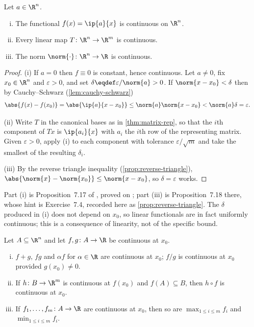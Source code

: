 \begin{proposition}
	\label{prop:linear-continuous}
	Let $a\in\R^n$.
	\begin{enumerate}[(i)]
		\item The functional $f(x)=\ip{a}{x}$ is continuous on $\R^n$.
		\item Every linear map $T\colon\R^n\to\R^m$ is continuous.
		\item The norm $\norm{\cdot}\colon\R^n\to\R$ is continuous.
	\end{enumerate}
\end{proposition}

\begin{proof}
	(i) If $a=0$ then $f\equiv0$ is constant, hence continuous. Let $a\neq0$, fix
	$x_0\in\R^n$ and $\varepsilon>0$, and set $\delta\eqdef\varepsilon/\norm{a}>0$.
	If $\norm{x-x_0}<\delta$ then by Cauchy--Schwarz
	(\autoref{lem:cauchy-schwarz})
	\[
		\abs{f(x)-f(x_0)}=\abs{\ip{a}{x-x_0}}\leq\norm{a}\norm{x-x_0}
		<\norm{a}\delta=\varepsilon .
	\]

	(ii) Write $T$ in the canonical bases as in \autoref{thm:matrix-rep}, so that the
	$i$th component of $Tx$ is $\ip{a_i}{x}$ with $a_i$ the $i$th row of the
	representing matrix. Given $\varepsilon>0$, apply (i) to each component with
	tolerance $\varepsilon/\sqrt m$ and take the smallest of the resulting $\delta_i$.

	(iii) By the reverse triangle inequality (\autoref{prop:reverse-triangle}),
	$\abs{\norm{x}-\norm{x_0}}\leq\norm{x-x_0}$, so $\delta=\varepsilon$ works.
\end{proof}

Part (i) is Proposition~7.17 of \textcite{fukuda2026notes}, proved on
\autocite[slide 52]{fukuda2026analysis}; part (iii) is Proposition~7.18 there,
whose hint is Exercise~7.4, recorded here as
\autoref{prop:reverse-triangle}. The $\delta$ produced in (i) does not depend on
$x_0$, so linear functionals are in fact uniformly continuous; this is a
consequence of linearity, not of the specific bound.

\begin{proposition}\label{prop:continuity-algebra}
	Let $A\subseteq\R^n$ and let $f,g\colon A\to\R$ be continuous at $x_0$.
	\begin{enumerate}[(i)]
		\item $f+g$, $fg$ and $\alpha f$ for $\alpha\in\R$ are continuous at $x_0$;
		      $f/g$ is continuous at $x_0$ provided $g(x_0)\neq0$.
		\item If $h\colon B\to\R^m$ is continuous at $f(x_0)$ and $f(A)\subseteq B$,
		      then $h\circ f$ is continuous at $x_0$.
		\item If $f_1,\dots,f_m\colon A\to\R$ are continuous at $x_0$, then so are
		      $\max_{1\leq i\leq m}f_i$ and $\min_{1\leq i\leq m}f_i$.
	\end{enumerate}
\end{proposition}

